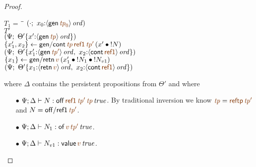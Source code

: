 \begin{proof}
\begin{description}
\begin{tabbing}
$T_1 = ~$ \= \qquad \= 
    $(\cdot; ~ x_0{:}\istrue{\susp{{\sf gen}\,\lf{{\it tp}_0}}})$
\\
\>$T'$
\\
\>\>$(\Psi; ~ \tackon{\Theta'}
      {x'{:}\istrue{\susp{{\sf gen}\,\lf{{\it tp}}}}})$
\\
\>$\trstep{x_1', x_2}
     {{\sf gen/cont}\,\lf{{\it tp}}\,\lf{\sf ref1}\,\lf{{\it tp}'}\,
         (\tfuser{x'}{\tbangr{N}})}$
\\ %
\>\>$(\Psi; ~ \tackon{\Theta'}
     {x_1'{:}\istrue{\susp{{\sf gen}\,\lf{{\it tp}'}}}, ~
      x_2{:}\istrue{\susp{{\sf cont}\,\lf{\sf ref1}}}})$
\\
\>$\trstep{x_1}
     {{\sf gen/retn}\,\lf{v}\,(\tfuser{x_1'}{\tfuser{\tbangr{N_1}}{\tbangr{N_{v1}}}})}$
\\
\>\>$(\Psi; ~ \tackon{\Theta'}{x_1{:}\istrue{\susp{{\sf retn}\,\lf{v}}}, ~
                   x_2{:}\istrue{\susp{{\sf cont}\,\lf{\sf ref1}}}})$
\end{tabbing}
where $\Delta$ contains the persistent propositions from $\Theta'$ and where
\begin{itemize}
\item[$\bullet$] $\Psi; \Delta \vdash N : \isconc{{\sf off}\,\lf{\sf ref1}\,\lf{{\it tp}'}\,\lf{{\it tp}}}$.  By traditional
  inversion we know $\lf{\it{tp}} = \lf{{\sf reftp}\,{\it tp}'}$ and $N = {\sf off/ref1}\,\lf{{\it tp}'}$.
\item[$\bullet$] $\Psi; \Delta \vdash N_1 : \isconc{{\sf of}\,\lf{v}\,\lf{tp'}}$. 
\item[$\bullet$] $\Psi; \Delta \vdash N_{v1} : \isconc{{\sf value}\,\lf{v}}$.
\end{itemize}


\end{description}
\end{proof}
